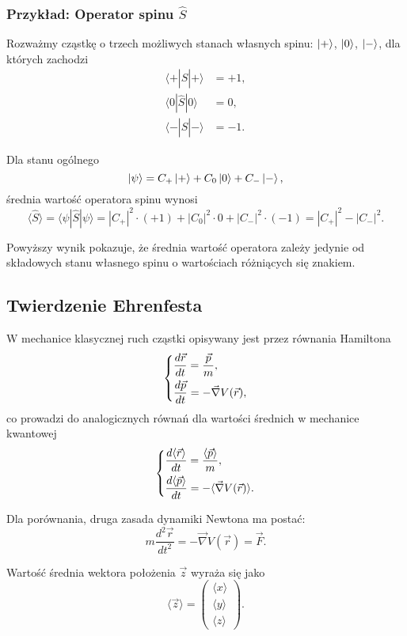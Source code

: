 \subsubsection*{Przykład: Operator spinu $\hat{S}$}

Rozważmy cząstkę o trzech możliwych stanach własnych spinu: $\ket{+}$, $\ket{0}$, $\ket{-}$, dla których zachodzi
\begin{align*}
\langle + | \hat{S} | + \rangle &= +1, \\
\langle 0 | \hat{S} | 0 \rangle &= 0, \\
\langle - | \hat{S} | - \rangle &= -1.
\end{align*}

Dla stanu ogólnego
$$
\ket{\psi} = C_+ \ket{+} + C_0 \ket{0} + C_- \ket{-},
$$
średnia wartość operatora spinu wynosi
$$
\langle \hat{S} \rangle = \langle \psi | \hat{S} | \psi \rangle = |C_+|^2 \cdot (+1) + |C_0|^2 \cdot 0 + |C_-|^2 \cdot (-1) = |C_+|^2 - |C_-|^2.
$$

Powyższy wynik pokazuje, że średnia wartość operatora zależy jedynie od składowych stanu własnego spinu o wartościach różniących się znakiem.

\subsection{Twierdzenie Ehrenfesta}

W mechanice klasycznej ruch cząstki opisywany jest przez równania Hamiltona
$$
\begin{dcases}
    \frac{d \vec{r}}{dt} = \frac{\vec{p}}{m}, \\
    \frac{d \vec{p}}{dt} = -\vec{\nabla} V(\vec{r}),
\end{dcases}
$$
co prowadzi do analogicznych równań dla wartości średnich w mechanice kwantowej
$$
\begin{dcases}
    \frac{d \langle \vec{r} \rangle}{dt} = \frac{\langle \vec{p} \rangle}{m}, \\
    \frac{d \langle \vec{p} \rangle}{dt} = -\langle \vec{\nabla} V(\vec{r}) \rangle.
\end{dcases}
$$

Dla porównania, druga zasada dynamiki Newtona ma postać:
$$
m \frac{d^2 \vec{r}}{dt^2} = -\vec{\nabla} V(\vec{r}) = \vec{F}.
$$

Wartość średnia wektora położenia $\vec{z}$ wyraża się jako
$$
\langle \vec{z} \rangle = 
\begin{pmatrix}
\langle x \rangle \\
\langle y \rangle \\
\langle z \rangle
\end{pmatrix}.
$$

